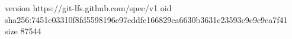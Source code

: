 version https://git-lfs.github.com/spec/v1
oid sha256:7451c03310f8fd5598196e97eddfc166829ca6630b3631e23593c9e9c9ea7f41
size 87544
